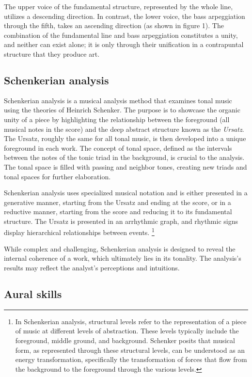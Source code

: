 The upper voice of the fundamental structure, represented by the whole line, utilizes a descending direction. In contrast, the lower voice, the bass arpeggiation through the fifth, takes an ascending direction (as shown in figure 1). The combination of the fundamental line and bass arpeggiation constitutes a unity, and neither can exist alone; it is only through their unification in a contrapuntal structure that they produce art.

\subsection{Schenkerian analysis}

Schenkerian analysis is a musical analysis method that examines tonal music using the theories of Heinrich Schenker. The purpose is to showcase the organic unity of a piece by highlighting the relationship between the foreground (all musical notes in the score) and the deep abstract structure known as the \textit{Ursatz}. The Ursatz, roughly the same for all tonal music, is then developed into a unique foreground in each work. The concept of tonal space, defined as the intervals between the notes of the tonic triad in the background, is crucial to the analysis. The tonal space is filled with passing and neighbor tones, creating new triads and tonal spaces for further elaboration.

Schenkerian analysis uses specialized musical notation and is either presented in a generative manner, starting from the Ursatz and ending at the score, or in a reductive manner, starting from the score and reducing it to its fundamental structure. The Ursatz is presented in an arrhythmic graph, and rhythmic signs display hierarchical relationships between events. \footnote{In Schenkerian analysis, structural levels refer to the representation of a piece of music at different levels of abstraction. These levels typically include the foreground, middle ground, and background. Schenker posits that musical form, as represented through these structural levels, can be understood as an energy transformation, specifically the transformation of forces that flow from the background to the foreground through the various levels.}

While complex and challenging, Schenkerian analysis is designed to reveal the internal coherence of a work, which ultimately lies in its tonality. The analysis's results may reflect the analyst's perceptions and intuitions.

\subsection{Aural skills}

